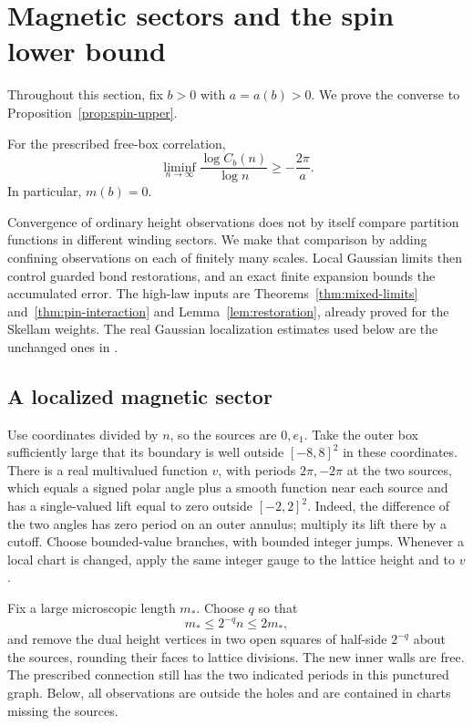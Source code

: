 \section{Magnetic sectors and the spin lower bound}
\label{sec:magnetic}

Throughout this section, fix \(b>0\) with \(a=a(b)>0\).
We prove the converse to Proposition~\ref{prop:spin-upper}.

\begin{proposition}\label{prop:spin-lower}
For the prescribed free-box correlation,
\[
 \liminf_{n\to\infty}\frac{\log C_b(n)}{\log n}
       \ge -\frac{2\pi}{a}.
\]
In particular, \(m(b)=0\).
\end{proposition}

Convergence of ordinary height observations does not by itself compare
partition functions in different winding sectors. We make that comparison
by adding confining observations on each of finitely many scales. Local
Gaussian limits then control guarded bond restorations, and an exact
finite expansion bounds the accumulated error. The high-law inputs are
Theorems~\ref{thm:mixed-limits} and~\ref{thm:pin-interaction} and
Lemma~\ref{lem:restoration}, already proved for the Skellam weights.
The real Gaussian localization estimates used below are the unchanged
ones in .

\subsection{A localized magnetic sector}

Use coordinates divided by \(n\), so the sources are \(0,e_1\).
Take the outer box sufficiently large that its boundary is well outside
\([-8,8]^2\) in these coordinates. There is a real multivalued function
\(v\), with periods \(2\pi,-2\pi\) at the two sources, which equals a
signed polar angle plus a smooth function near each source and has a
single-valued lift equal to zero outside \([-2,2]^2\). Indeed, the
difference of the two angles has zero period on an outer annulus;
multiply its lift there by a cutoff. Choose bounded-value branches,
with bounded integer jumps. Whenever a local chart is changed, apply
the same integer gauge to the lattice height and to \(v\).

Fix a large microscopic length \(m_*\). Choose \(q\) so that
\[
                 m_*\le 2^{-q}n\le 2m_*,
\]
and remove the dual height vertices in two open squares of half-side
\(2^{-q}\) about the sources, rounding their faces to lattice divisions.
The new inner walls are free. The prescribed connection still has the
two indicated periods in this punctured graph. Below, all observations
are outside the holes and are contained in charts missing the sources.

